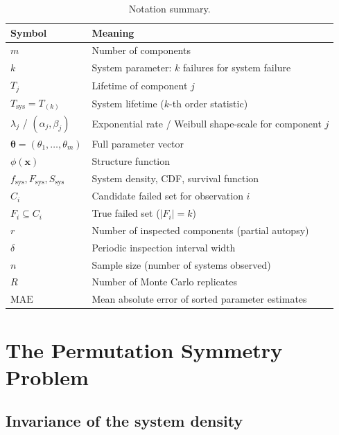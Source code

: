 \documentclass[12pt]{article}
\newcommand{\Tsys}{T_{\mathrm{sys}}}
\newcommand{\fsys}{f_{\mathrm{sys}}}
\newcommand{\Fsys}{F_{\mathrm{sys}}}
\newcommand{\Ssys}{S_{\mathrm{sys}}}
\newcommand{\MAE}{\mathrm{MAE}}
\newcommand{\btheta}{\boldsymbol{\theta}}
\newcommand{\bx}{\mathbf{x}}
\begin{document}
\begin{table}[t]
\centering
\caption{Notation summary.}\label{tab:notation}
\begin{tabular}{@{}ll@{}}
\toprule
Symbol & Meaning \\
\midrule
$m$ & Number of components \\
$k$ & System parameter: $k$ failures for system failure \\
$T_j$ & Lifetime of component $j$ \\
$\Tsys = T_{(k)}$ & System lifetime ($k$-th order statistic) \\
$\lambda_j$ / $(\alpha_j, \beta_j)$ & Exponential rate / Weibull shape-scale
  for component $j$ \\
$\btheta = (\theta_1, \ldots, \theta_m)$ & Full parameter vector \\
$\phi(\bx)$ & Structure function \\
$\fsys, \Fsys, \Ssys$ & System density, CDF, survival function \\
$C_i$ & Candidate failed set for observation $i$ \\
$F_i \subseteq C_i$ & True failed set ($|F_i| = k$) \\
$r$ & Number of inspected components (partial autopsy) \\
$\delta$ & Periodic inspection interval width \\
$n$ & Sample size (number of systems observed) \\
$R$ & Number of Monte Carlo replicates \\
$\MAE$ & Mean absolute error of sorted parameter estimates \\
\bottomrule
\end{tabular}
\end{table}


\section{The Permutation Symmetry Problem}\label{sec:symmetry}

\subsection{Invariance of the system density}\label{sec:invariance}
\end{document}
